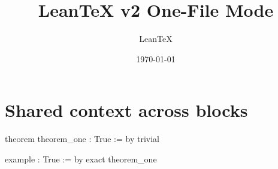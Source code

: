 \documentclass{article}
\title{LeanTeX v2 One-File Mode}
\author{LeanTeX}
\date{\today}
\begin{document}
\maketitle

\section*{Shared context across blocks}

\begin{lean}[show=both]
theorem theorem_one : True := by
  trivial
\end{lean}

\begin{lean}[show=both]
example : True := by
  exact theorem_one
\end{lean}
\end{document}
